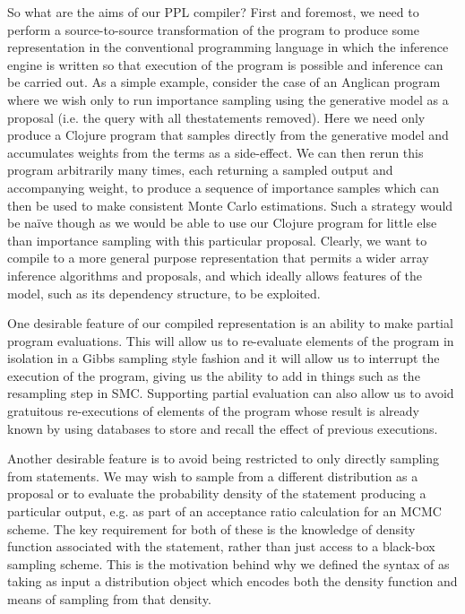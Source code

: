 So what are the aims of our PPL compiler?  First and foremost, we need to
perform a source-to-source transformation of the program to
produce some representation in the conventional programming language in which
the inference engine is written so that execution of the program is possible and inference
can be carried out.  As a simple example, consider the case of an Anglican program where
we wish only to run importance sampling using the generative model as a proposal 
(i.e. the query with all the\observe statements removed).  Here we need only produce a Clojure program
that samples directly from the generative model and accumulates weights from the
\observe terms as a side-effect.  We can then rerun this program arbitrarily many
times, each returning a sampled output and accompanying weight, to produce a sequence
of importance samples which can then be used to make consistent Monte Carlo estimations.
Such a strategy would be na\"{i}ve though as we would be able to use our Clojure program
for little else than importance sampling with this particular proposal.  Clearly, we want
to compile to a more general purpose representation that permits a wider array inference algorithms
and proposals, and which ideally allows features of the model, such as its dependency
structure, to be exploited.

One desirable feature of our compiled representation is an ability to make partial
program evaluations.  This will allow us to re-evaluate elements of the program in
isolation in a Gibbs sampling style fashion and it will allow us to interrupt the execution
of the program, giving us the ability to add in things such as the resampling step in SMC.
Supporting partial evaluation can also allow us to avoid gratuitous re-executions of
elements of the program whose result is already known by using databases to store and
recall the effect of previous executions.

Another desirable feature is to avoid being restricted to only directly sampling from \sample
statements.  We may wish to sample from a different distribution as a proposal or to evaluate
the probability density of the \sample statement producing a particular output, e.g. as part
of an acceptance ratio calculation for an MCMC scheme.  The key requirement for both of these
is the knowledge of density function associated with the \sample statement, rather than
just access to a black-box sampling scheme.  This is the motivation behind why we defined
the syntax of \sample as taking as input a distribution object which encodes both the density
function and means of sampling from that density.

